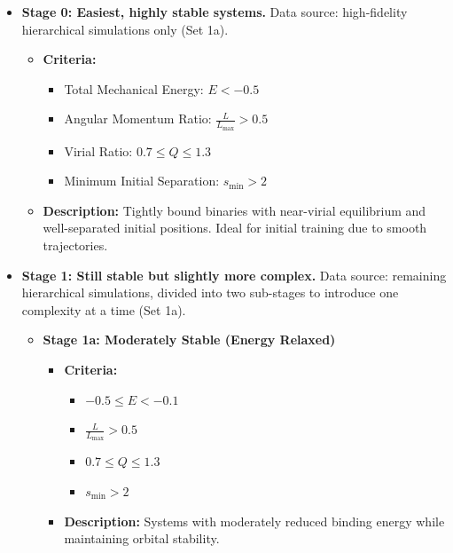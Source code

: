 \documentclass{article}
\begin{document}
\begin{itemize}

    \item \textbf{Stage 0: Easiest, highly stable systems.}  Data source: high-fidelity hierarchical simulations only (Set 1a). 
    \begin{itemize}
        \item \textbf{Criteria:}
        \begin{itemize}
            \item Total Mechanical Energy: $E < -0.5$
            \item Angular Momentum Ratio: $\frac{L}{L_{\max}} > 0.5$
            \item Virial Ratio: $0.7 \leq Q \leq 1.3$
            \item Minimum Initial Separation: $s_{\min} > 2$
        \end{itemize}
        \item \textbf{Description:} Tightly bound binaries with near-virial equilibrium and well-separated initial positions. Ideal for initial training due to smooth trajectories.
    \end{itemize}
    
    
    
    \item \textbf{Stage 1: Still stable but slightly more complex.} Data source: remaining hierarchical simulations, 
    divided into two sub-stages to introduce one complexity at a time (Set 1a).  

    \begin{itemize}
        \item \textbf{Stage 1a: Moderately Stable (Energy Relaxed)}
        \begin{itemize}
            \item \textbf{Criteria:}
            \begin{itemize}
                \item $-0.5 \leq E < -0.1$
                \item $\frac{L}{L_{\max}} > 0.5$
                \item $0.7 \leq Q \leq 1.3$
                \item $s_{\min} > 2$
            \end{itemize}
            \item \textbf{Description:} Systems with moderately reduced binding energy while maintaining orbital stability.
        \end{itemize}


\end{itemize}
\end{itemize}
\end{document}
